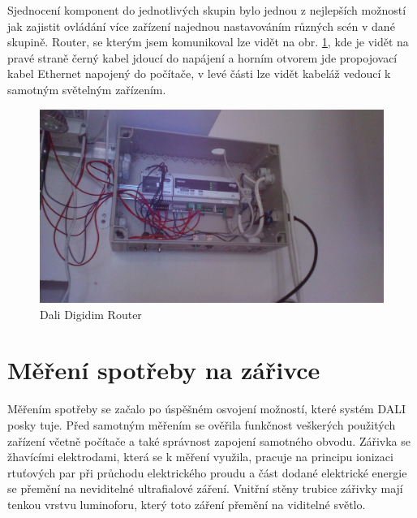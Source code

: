 \documentclass[FM,RP]{tulthesis}
\begin{document}
    Sjednocení komponent do jednotlivých skupin bylo jednou z nejlepších možností jak zajistit ovládání více zařízení najednou nastavováním různých scén v dané skupině. Router, se kterým jsem komunikoval lze vidět na obr. \ref{dalisys}, kde je vidět na pravé straně černý kabel jdoucí do napájení a horním otvorem jde propojovací kabel Ethernet napojený do počítače, v levé části lze vidět kabeláž vedoucí k samotným světelným zařízením.
  \vspace{2em}
    \begin{figure}[h]
    	\begin{center}
    		
    		\includegraphics[scale=0.12]{dalisys.jpg}
    		\caption{Dali Digidim Router}
    		\label{dalisys}
    	\end{center}
    \end{figure}
    
    
  \chapter {Měření spotřeby na zářivce}
   Měřením spotřeby se začalo po úspěšném osvojení možností, které systém DALI posky
   tuje. Před samotným měřením se ověřila funkčnost veškerých použitých zařízení včetně počítače a také správnost zapojení samotného obvodu. Zářivka se žhavícími elektrodami, která se k měření využila, pracuje na principu ionizaci rtuťových par při průchodu elektrického proudu a část dodané elektrické energie se přemění na neviditelné ultrafialové záření. Vnitřní stěny trubice zářivky mají tenkou vrstvu luminoforu, který toto záření přemění na viditelné světlo.
   
\end{document}
